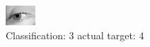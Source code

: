 \begin{figure}[h!]
\begin{center}
\includegraphics[width=0.60\columnwidth]{figures/ID2915_class_3_target_4.png}
\end{center}
\caption{ Classification: 3 actual target: 4}
\label{fig:ID2915_class_3_target_4}
\end{figure}
